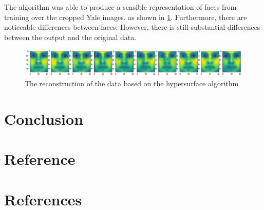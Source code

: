 \documentclass{article} %
\begin{document}
The algorithm was able to produce a sensible representation of faces from training over the cropped Yale images, as shown in \ref{figure:hypersurface_learned_faces}. Furthermore, there are noticeable differences between faces. However, there is still substantial differences between the output and the original data.

\begin{figure}[h]
  \includegraphics[width=\textwidth]{hypersurface_learned_faces}
  \caption{The reconstruction of the data based on the hypersurface algorithm}
  \label{figure:hypersurface_learned_faces}
\end{figure}

\section{Conclusion}

\section{Reference}

\section{References}


\end{document}

